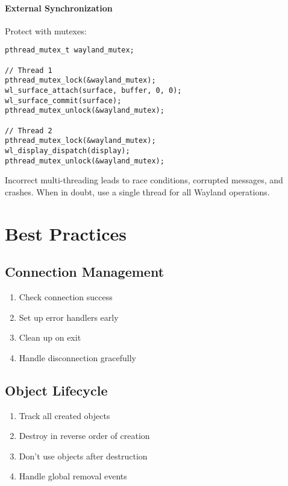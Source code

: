 \paragraph{External Synchronization}
Protect with mutexes:
\begin{lstlisting}[style=cstyle, caption=Manual Locking]
pthread_mutex_t wayland_mutex;

// Thread 1
pthread_mutex_lock(&wayland_mutex);
wl_surface_attach(surface, buffer, 0, 0);
wl_surface_commit(surface);
pthread_mutex_unlock(&wayland_mutex);

// Thread 2
pthread_mutex_lock(&wayland_mutex);
wl_display_dispatch(display);
pthread_mutex_unlock(&wayland_mutex);
\end{lstlisting}

\begin{warningbox}
Incorrect multi-threading leads to race conditions, corrupted messages, and crashes. When in doubt, use a single thread for all Wayland operations.
\end{warningbox}

\section{Best Practices}

\subsection{Connection Management}

\begin{enumerate}
    \item Check connection success
    \item Set up error handlers early
    \item Clean up on exit
    \item Handle disconnection gracefully
\end{enumerate}

\subsection{Object Lifecycle}

\begin{enumerate}
    \item Track all created objects
    \item Destroy in reverse order of creation
    \item Don't use objects after destruction
    \item Handle global removal events
\end{enumerate}

